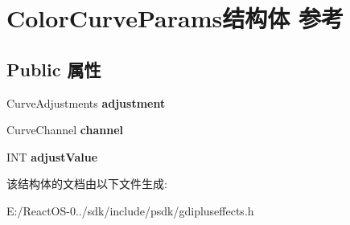 \hypertarget{struct_color_curve_params}{}\section{Color\+Curve\+Params结构体 参考}
\label{struct_color_curve_params}
\subsection*{Public 属性}
\begin{DoxyCompactItemize}
\item 
\mbox{\label{struct_color_curve_params_afa5cff8e2d2073dfb7d4927b14c837de}} 
Curve\+Adjustments {\bfseries adjustment}
\item 
\mbox{\label{struct_color_curve_params_a016d4d195c7d6b360b527e34d8cd000f}} 
Curve\+Channel {\bfseries channel}
\item 
\mbox{\label{struct_color_curve_params_a9bbff8df8799516b05c4dba423e7f88a}} 
I\+NT {\bfseries adjust\+Value}
\end{DoxyCompactItemize}


该结构体的文档由以下文件生成\+:\begin{DoxyCompactItemize}
\item 
E\+:/\+React\+O\+S-\/0../sdk/include/psdk/gdipluseffects.\+h\end{DoxyCompactItemize}
